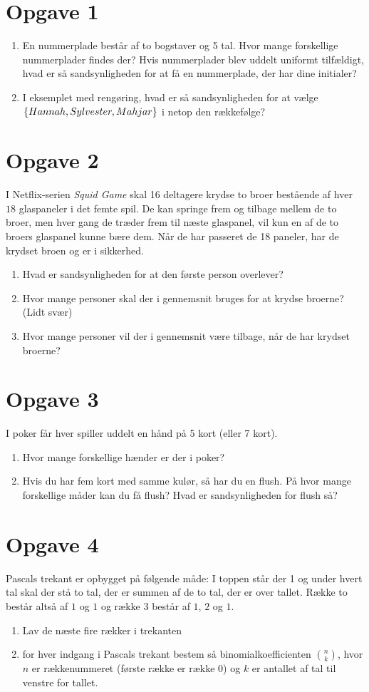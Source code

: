\section*{Opgave 1}
\begin{enumerate}[label=\roman*)]
\item En nummerplade består af to bogstaver og 5 tal. Hvor mange forskellige nummerplader findes der? Hvis nummerplader blev uddelt uniformt tilfældigt, hvad er så sandsynligheden for at få en nummerplade, der har dine initialer?
\item I eksemplet med rengøring, hvad er så sandsynligheden for at vælge $\\
\{Hannah, Sylvester, Mahjar\}$ i netop den rækkefølge?
\end{enumerate}
\section*{Opgave 2}
I Netflix-serien \textit{Squid Game} skal 16 deltagere krydse to broer bestående af hver $18$ glaspaneler i det femte spil. De kan springe frem og tilbage mellem de to broer, men hver gang de træder frem til næste glaspanel, vil kun en af de to broers glaspanel kunne bære dem. Når de har passeret de 18 paneler, har de krydset broen og er i sikkerhed.
\begin{enumerate}[label=\roman*)]
\item Hvad er sandsynligheden for at den første person overlever?
\item Hvor mange personer skal der i gennemsnit bruges for at krydse broerne? (Lidt svær)
\item Hvor mange personer vil der i gennemsnit være tilbage, når de har krydset broerne?
\end{enumerate}
\section*{Opgave 3}
I poker får hver spiller uddelt en hånd på 5 kort (eller 7 kort). 
\begin{enumerate}[label=\roman*)]
\item Hvor mange forskellige hænder er der i poker?
\item Hvis du har fem kort med samme kulør, så har du en flush. På hvor mange forskellige måder kan du få flush? Hvad er sandsynligheden for flush så?
\end{enumerate}
\section*{Opgave 4}
Pascals trekant er opbygget på følgende måde: I toppen står der 1 og under hvert tal skal der stå to tal, der er summen af de to tal, der er over tallet. Række to består altså af $1$ og $1$ og række 3 består af $1$, $2$ og $1$.
\begin{enumerate}[label=\roman*)]
\item Lav de næste fire rækker i trekanten
\item for hver indgang i Pascals trekant bestem så binomialkoefficienten $\binom{n}{k}$, hvor $n$ er rækkenummeret (første række er række 0) og $k$ er antallet af tal til venstre for tallet.
\end{enumerate}